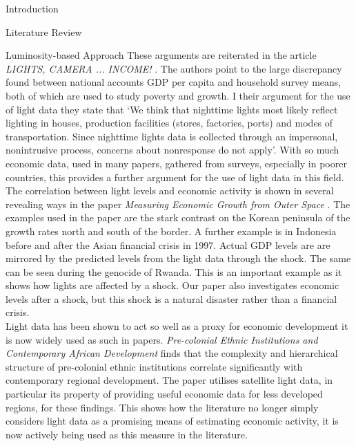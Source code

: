 \documentclass[12.5pt,fleqn,leqno,letterpaper]{article}
\begin{document}
\begin{section}{Introduction}
\begin{subsection}{Literature Review}
\begin{subsubsection}{Luminosity-based Approach}
      These arguments are reiterated in the article \textit{LIGHTS, CAMERA ... INCOME!}  \cite{lightcamera}. The authors point to the large discrepancy found between national accounts GDP per capita and household survey means, both of which are used to study poverty and growth. I their argument for the use of light data they state that `We think that nighttime lights most likely reflect lighting in houses, production facilities (stores, factories, ports) and modes of transportation. Since nighttime lights data is collected through an impersonal, nonintrusive process, concerns about nonresponse do not apply'. With so much economic data, used in many papers, gathered from surveys, especially in poorer countries, this provides a further argument for the use of light data in this field. \\ 
      The correlation between light levels and economic activity is shown in several revealing ways in the paper \textit{Measuring Economic Growth from Outer Space} \cite{growthlights}. The examples used in the paper are the stark contrast on the Korean peninsula of the growth rates north and south of the border. A further example is in Indonesia before and after the Asian financial crisis in 1997. Actual GDP levels are are mirrored by the predicted levels from the light data through the shock. The same can be seen during the genocide of Rwanda. This is an important example as it shows how lights are affected by a shock. Our paper also investigates economic levels after a shock, but this shock is a natural disaster rather than a financial crisis. \\
      Light data has been shown to act so well as a proxy for economic development it is now widely used as such in papers. \textit{Pre-colonial Ethnic Institutions and Contemporary African Development} \cite{africalights} finds that the complexity and hierarchical structure of pre-colonial ethnic institutions correlate significantly with contemporary regional development. The paper utilises satellite light data, in particular its property of providing useful economic data for less developed regions, for these findings. This shows how the literature no longer simply considers light data as a promising means of estimating economic activity, it is now actively being used as this measure in the literature. 
    \end{subsubsection}


\end{subsection}
\end{section}
\end{document}
